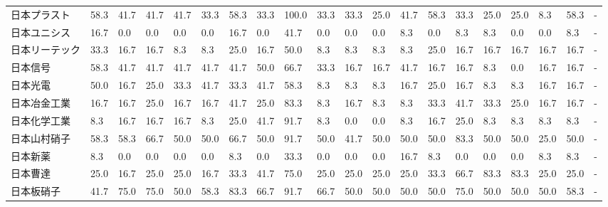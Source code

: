 \begin{tabular}{llllllllllllllllllll}
日本プラスト          &   58.3 &   41.7 &      41.7 &      41.7 &       33.3 &   58.3 &   33.3 &  100.0 &    33.3 &    33.3 &   25.0 &  41.7 &   58.3 &    33.3 &    25.0 &  25.0 &   8.3 &  58.3 &     - \\
日本ユニシス          &   16.7 &    0.0 &       0.0 &       0.0 &        0.0 &   16.7 &    0.0 &   41.7 &     0.0 &     0.0 &    0.0 &   8.3 &    0.0 &     8.3 &     8.3 &   0.0 &   0.0 &   8.3 &     - \\
日本リーテック         &   33.3 &   16.7 &      16.7 &       8.3 &        8.3 &   25.0 &   16.7 &   50.0 &     8.3 &     8.3 &    8.3 &   8.3 &   25.0 &    16.7 &    16.7 &  16.7 &  16.7 &  16.7 &     - \\
日本信号            &   58.3 &   41.7 &      41.7 &      41.7 &       41.7 &   41.7 &   50.0 &   66.7 &    33.3 &    16.7 &   16.7 &  41.7 &   16.7 &    16.7 &     8.3 &   0.0 &  16.7 &  16.7 &     - \\
日本光電            &   50.0 &   16.7 &      25.0 &      33.3 &       41.7 &   33.3 &   41.7 &   58.3 &     8.3 &     8.3 &    8.3 &  16.7 &   25.0 &    16.7 &     8.3 &   8.3 &  16.7 &  16.7 &     - \\
日本冶金工業          &   16.7 &   16.7 &      25.0 &      16.7 &       16.7 &   41.7 &   25.0 &   83.3 &     8.3 &    16.7 &    8.3 &   8.3 &   33.3 &    41.7 &    33.3 &  25.0 &  16.7 &  16.7 &     - \\
日本化学工業          &    8.3 &   16.7 &      16.7 &      16.7 &        8.3 &   25.0 &   41.7 &   91.7 &     8.3 &     0.0 &    0.0 &   8.3 &   16.7 &    25.0 &     8.3 &   8.3 &   8.3 &   8.3 &     - \\
日本山村硝子          &   58.3 &   58.3 &      66.7 &      50.0 &       50.0 &   66.7 &   50.0 &   91.7 &    50.0 &    41.7 &   50.0 &  50.0 &   50.0 &    83.3 &    50.0 &  50.0 &  25.0 &  50.0 &     - \\
日本新薬            &    8.3 &    0.0 &       0.0 &       0.0 &        0.0 &    8.3 &    0.0 &   33.3 &     0.0 &     0.0 &    0.0 &  16.7 &    8.3 &     0.0 &     0.0 &   0.0 &   8.3 &   8.3 &     - \\
日本曹達            &   25.0 &   16.7 &      25.0 &      25.0 &       16.7 &   33.3 &   41.7 &   75.0 &    25.0 &    25.0 &   25.0 &  25.0 &   33.3 &    66.7 &    83.3 &  83.3 &  25.0 &  25.0 &     - \\
日本板硝子           &   41.7 &   75.0 &      75.0 &      50.0 &       58.3 &   83.3 &   66.7 &   91.7 &    66.7 &    50.0 &   50.0 &  50.0 &   50.0 &    75.0 &    50.0 &  50.0 &  50.0 &  58.3 &     - \\

\end{tabular}
